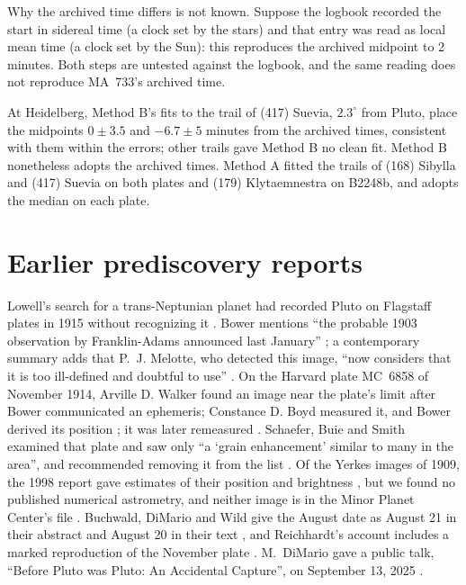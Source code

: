 \documentclass[11pt]{article}
\begin{document}
\begin{appendices}
Why the archived time differs is not known. Suppose the logbook recorded the start in sidereal time (a clock set by the stars) and that entry was read as local mean time (a clock set by the Sun): this reproduces the archived midpoint to 2 minutes. Both steps are untested against the logbook, and the same reading does not reproduce MA~733's archived time.

At Heidelberg, Method B's fits to the trail of (417) Suevia, $2.3^\circ$ from Pluto, place the midpoints $0\pm3.5$ and $-6.7\pm5$ minutes from the archived times, consistent with them within the errors; other trails gave Method B no clean fit. Method B nonetheless adopts the archived times. Method A fitted the trails of (168) Sibylla and (417) Suevia on both plates and (179) Klytaemnestra on B2248b, and adopts the median on each plate.

\section{Earlier prediscovery reports}
\label{app:history}

Lowell's search for a trans-Neptunian planet had recorded Pluto on Flagstaff plates in 1915 without recognizing it \cite{Nature1931}. Bower mentions ``the probable 1903 observation by Franklin-Adams announced last January'' \cite{Bower1931}; a contemporary summary adds that P.~J. Melotte, who detected this image, ``now considers that it is too ill-defined and doubtful to use'' \cite{Nature1931}. On the Harvard plate MC~6858 of November 1914, Arville D. Walker found an image near the plate's limit after Bower communicated an ephemeris; Constance D. Boyd measured it, and Bower derived its position \cite{Shapley1932}; it was later remeasured \cite{Johnstone1932}. Schaefer, Buie and Smith examined that plate and saw only ``a `grain enhancement' similar to many in the area'', and recommended removing it from the list \cite[Section~6]{Schaefer2008}. Of the Yerkes images of 1909, the 1998 report gave estimates of their position and brightness \cite{Wild1998}, but we found no published numerical astrometry, and neither image is in the Minor Planet Center's file \cite{MPC}. Buchwald, DiMario and Wild give the August date as August 21 in their abstract and August 20 in their text \cite{Buchwald2000}, and Reichhardt's account includes a marked reproduction of the November plate \cite{Reichhardt2015}. M.~DiMario gave a public talk, ``Before Pluto was Pluto: An Accidental Capture'', on September 13, 2025 \cite{DiMario2025}.


\end{appendices}
\end{document}

